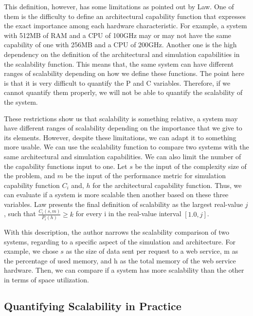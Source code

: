 This definition, however, has some limitations as pointed out by Law. One of them is the difficulty to define an architectural capability function that expresses the exact importance among each hardware characteristic. For example, a system with 512MB of RAM and a CPU of 100GHz may or may not have the same capability of one with 256MB and a CPU of 200GHz. Another one is the high dependency on the definition of the architectural and simulation capabilities in the scalability function. This means that, the same system can have different ranges of scalability depending on how we define these functions. The point here is that it is very difficult to quantify the P and C variables. Therefore, if we cannot quantify them properly, we will not be able to quantify the scalability of the system. 

These restrictions show us that scalability is something relative, a system may have different ranges of scalability depending on the importance that we give to its elements. However, despite these limitations, we can adapt it to something more usable. We can use the scalability function to compare two systems with the same architectural and simulation capabilities. We can also limit the number of the capability functions input to one. Let $s$ be the input of the complexity size of the problem, and $m$ be the input of the performance metric for simulation capability function $C_{i}$ and, $h$ for the architectural capability function. Thus, we can evaluate if a system is more scalable then another based on these three variables. Law presents the final definition of scalability as the largest real-value $j$, such that $\frac{C_{i}(s, m)}{P_{i}(h)} \geq k$ for every i in the real-value interval $[1.0, j]$.

With this description, the author narrows the scalability comparison of two systems, regarding to a specific aspect of the simulation and architecture. For example, we chose $s$ as the size of data sent per request to a web service, m as the percentage of used memory, and h as the total memory of the web service hardware. Then, we can compare if a system has more scalability than the other in terms of space utilization.

\subsection{Quantifying Scalability in Practice}

